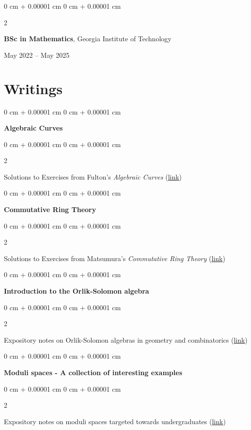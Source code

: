 \documentclass[10pt, letterpaper]{article}
\newenvironment{onecolentry}{
    \begin{adjustwidth}{
        0 cm + 0.00001 cm
    }{
        0 cm + 0.00001 cm
    }
}{
    \end{adjustwidth}
} %
\newenvironment{twocolentry}[2][]{
    \onecolentry
    \def\secondColumn{#2}
    \setcolumnwidth{\fill, 4.5 cm}
    \begin{paracol}{2}
}{
    \switchcolumn \raggedleft \secondColumn
    \end{paracol}
    \endonecolentry
} %
\begin{document}
        \begin{twocolentry}{
            May 2022 – May 2025
        }
            \textbf{BSc in Mathematics}, Georgia Institute of Technology
        \end{twocolentry}
        \vspace{0.1cm}

        \section{Writings}
        \begin{onecolentry}
            \textbf{Algebraic Curves}
        \end{onecolentry}
        \vspace{0.05cm}
        \begin{twocolentry}{
            2026
        }
            Solutions to Exercises from Fulton's \emph{Algebraic Curves} (\href{https://connorjhaynes.github.io/fultonsolns.pdf}{link})
        \end{twocolentry}
        \vspace{0.2cm}
        \begin{onecolentry}
            \textbf{Commutative Ring Theory}
        \end{onecolentry}
        \vspace{0.05cm}
        \begin{twocolentry}{
            2026
        }
            Solutions to Exercises from Matsumura's \emph{Commutative Ring Theory} (\href{https://connorjhaynes.github.io/matsumurasolns.pdf}{link})
        \end{twocolentry}
        \vspace{0.2cm}
        \begin{onecolentry}
            \textbf{Introduction to the Orlik-Solomon algebra}
        \end{onecolentry}
        \vspace{0.05cm}
        \begin{twocolentry}{
            2025
        }
            Expository notes on Orlik-Solomon algebras in geometry and combinatorics (\href{https://connorjhaynes.github.io/orliksolomon.pdf}{link})
        \end{twocolentry}
        \vspace{0.2cm}
        \begin{onecolentry}
            \textbf{Moduli spaces - A collection of interesting examples}
        \end{onecolentry}
        \vspace{0.05cm}
        \begin{twocolentry}{
            2025
        }
            Expository notes on moduli spaces targeted towards undergraduates (\href{https://connorjhaynes.github.io/6441paper.pdf}{link})
        \end{twocolentry}
        
\end{document}
